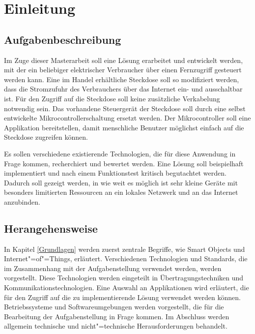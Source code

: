 
\chapter{Einleitung} \label{Einleitung}

\section{Aufgabenbeschreibung} \label{Aufgabenbeschreibung}

Im Zuge dieser Masterarbeit soll eine Lösung erarbeitet und entwickelt werden, mit der ein beliebiger elektrischer Verbraucher über einen Fernzugriff gesteuert werden kann. Eine im Handel erhältliche Steckdose soll so modifiziert werden, dass die Stromzufuhr des Verbrauchers über das Internet ein- und ausschaltbar ist. Für den Zugriff auf die Steckdose soll keine zusätzliche Verkabelung notwendig sein. Das vorhandene Steuergerät der Steckdose soll durch eine selbst entwickelte Mikrocontrollerschaltung ersetzt werden. Der Mikrocontroller soll eine Applikation bereitstellen, damit menschliche Benutzer möglichst einfach auf die Steckdose zugreifen können.

Es sollen verschiedene existierende Technologien, die für diese Anwendung in Frage kommen, recherchiert und bewertet werden.  Eine Lösung soll beispielhaft implementiert und nach einem Funktionstest kritisch begutachtet werden. Dadurch soll gezeigt werden, in wie weit es möglich ist sehr kleine Geräte mit besonders limitierten Ressourcen an ein lokales Netzwerk und an das Internet anzubinden.

\section{Herangehensweise}

In Kapitel \ref{Grundlagen} werden zuerst zentrale Begriffe, wie Smart Objects und Internet"=of"=Things, erläutert. Verschiedenen Technologien und Standards, die im Zusammenhang mit der Aufgabenstellung verwendet werden, werden vorgestellt. Diese Technologien werden eingeteilt in Übertragungstechniken und Kommunikationstechnologien. Eine Auswahl an Applikationen wird erläutert, die für den Zugriff auf die zu implementierende Lösung verwendet werden können. Betriebssysteme und Softwareumgebungen werden vorgestellt, die für die Bearbeitung der Aufgabenstellung in Frage kommen. Im Abschluss werden allgemein technische und nicht"=technische Herausforderungen behandelt.

